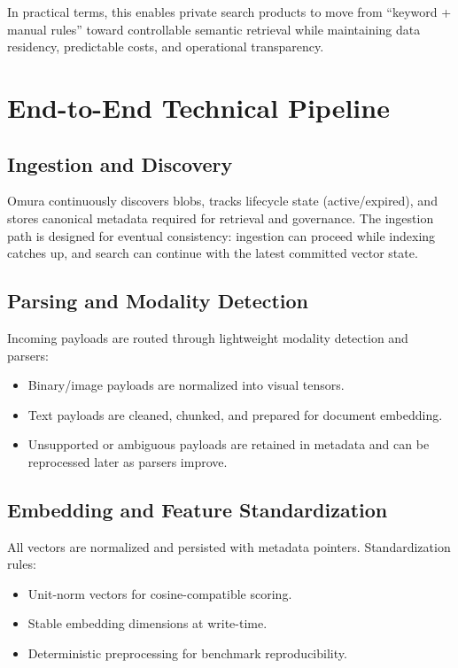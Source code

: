 \documentclass[11pt]{article}
\begin{document}
In practical terms, this enables private search products to move from
``keyword + manual rules'' toward controllable semantic retrieval while maintaining
data residency, predictable costs, and operational transparency.

\section{End-to-End Technical Pipeline}
\subsection{Ingestion and Discovery}
Omura continuously discovers blobs, tracks lifecycle state (active/expired), and
stores canonical metadata required for retrieval and governance. The ingestion path
is designed for eventual consistency: ingestion can proceed while indexing catches up,
and search can continue with the latest committed vector state.

\subsection{Parsing and Modality Detection}
Incoming payloads are routed through lightweight modality detection and parsers:
\begin{itemize}[leftmargin=1.2em]
  \item Binary/image payloads are normalized into visual tensors.
  \item Text payloads are cleaned, chunked, and prepared for document embedding.
  \item Unsupported or ambiguous payloads are retained in metadata and can be
  reprocessed later as parsers improve.
\end{itemize}

\subsection{Embedding and Feature Standardization}
All vectors are normalized and persisted with metadata pointers. Standardization rules:
\begin{itemize}[leftmargin=1.2em]
  \item Unit-norm vectors for cosine-compatible scoring.
  \item Stable embedding dimensions at write-time.
  \item Deterministic preprocessing for benchmark reproducibility.
\end{itemize}
\end{document}
